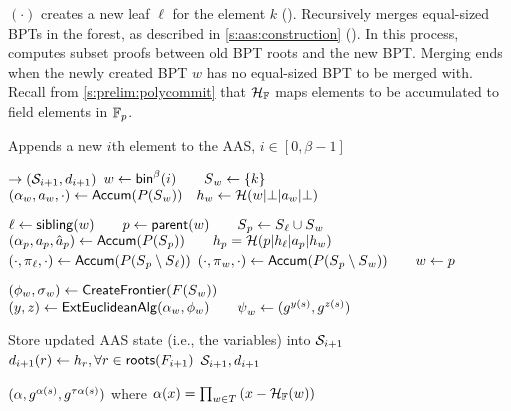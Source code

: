 {\append}$(\cdot)$ creates a new leaf $\ell$ for the element $k$ ().
Recursively merges equal-sized BPTs in the forest, as described in \cref{s:aas:construction} ().
In this process, computes subset proofs between old BPT roots and the new BPT.
Merging ends when the newly created BPT $w$ has no equal-sized BPT to be merged with.
Recall from \cref{s:prelim:polycommit} that $\mathcal{H}_{\mathbb{F}}$ maps elements to be accumulated to field elements in $\mathbb{F}_p$.
\begin{algorithm}[H]%
    \caption{\small Appends a new $i$th element to the AAS, $i\in[0,\beta-1]$}
    \label{a:aas:append}
    \footnotesize
    \begin{algorithmic}[1]
     $\rightarrow (\mathcal{S}_{i+1}, d_{i+1})$
        \State $w \gets \mathsf{bin}^\beta(i) \qquad \textcolor{black}{S}_w \gets \{k\}$
        \label{a:aas:append:create-leaf-begin}
        \State $(\alpha_w, {\textcolor{black}{a}}_w, \cdot) \gets \mathsf{Accum}(P(\textcolor{black}{S}_w)) \quad \textcolor{black}{h}_w \gets \mathcal{H}(w|\bot|{\textcolor{black}{a}}_w|\bot)$
        \label{a:aas:append:create-leaf-end}

        \label{a:aas:append:merge-begin}
            \State $\ell \gets\mathsf{sibling}(w) \qquad p\gets \mathsf{parent}(w) \qquad \textcolor{black}{S}_p \gets \textcolor{black}{S}_\ell\cup \textcolor{black}{S}_w$
            \State $(\alpha_p, {\textcolor{black}{a}}_p, \textcolor{black}{\hat{a}}_p) \gets \mathsf{Accum}(P(\textcolor{black}{S}_p))\qquad \textcolor{black}{h}_p = \mathcal{H}(p|\textcolor{black}{h}_\ell|{\textcolor{black}{a}}_p|\textcolor{black}{h}_w)$
            \State $(\cdot, \textcolor{black}{\pi}_\ell, \cdot) \gets \mathsf{Accum}(P(\textcolor{black}{S}_p\setminus \textcolor{black}{S}_\ell))$
            \State $(\cdot, \textcolor{black}{\pi}_w, \cdot) \gets \mathsf{Accum}(P(\textcolor{black}{S}_p \setminus \textcolor{black}{S}_w)) \qquad w\gets p$
        \EndWhile
        \label{a:aas:append:merge-end}

        \label{a:aas:append:root-at-begin}
        \State $(\phi_w,\textcolor{black}{\sigma}_w) \gets \mathsf{CreateFrontier}(F(\textcolor{black}{S}_w))$
        \State $(y,z)\gets \mathsf{ExtEuclideanAlg}(\alpha_w, \phi_w)\qquad {\textcolor{black}{\psi}}_w \gets ( g^{y(s)}, g^{z(s)})$
        \label{a:aas:append:root-at-end}

        \State Store updated AAS state (i.e., the  variables) into $\mathcal{S}_{i+1}$
        \State $d_{i+1}(r) \gets \textcolor{black}{h}_r, \forall r \in \mathsf{roots}(F_{i+1})$
        \State \Return $\mathcal{S}_{i+1}, d_{i+1}$
    \EndFunction

        \State \Return $(\alpha, g^{\alpha(s)}, g^{\tau \alpha(s)})$ where $\alpha(x)=\prod_{w \in T} {(x-\mathcal{H}_{\mathbb{F}}(w))}$
    \EndFunction
    \end{algorithmic}
\end{algorithm}

